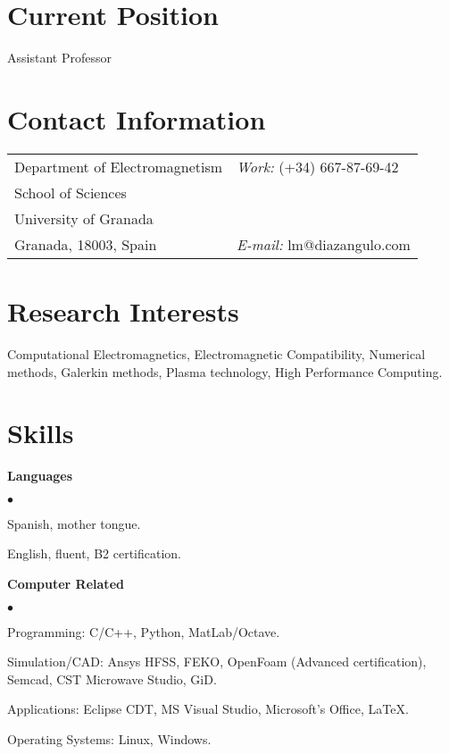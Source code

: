 \documentclass[margin,line]{res}
\newenvironment{list2}{
  \begin{list}{$\bullet$}{%
      \setlength{\itemsep}{0in}
      \setlength{\parsep}{0in} \setlength{\parskip}{0in}
      \setlength{\topsep}{0in} \setlength{\partopsep}{0in} 
      \setlength{\leftmargin}{0.2in}}}{\end{list}}
\begin{document}

\begin{resume}
\section{\sc Current Position}
 Assistant Professor
\section{\sc Contact Information}
\vspace{.05in}
\begin{tabular}{@{}p{2in}p{4in}}
Department of Electromagnetism   & {\it Work:}  (+34) 667-87-69-42 \\            
School of Sciences             & \\         
University of Granada            & \\
Granada, 18003, Spain            & {\it E-mail:}  lm@diazangulo.com\\       
\end{tabular}

\section{\sc Research Interests}
Computational Electromagnetics,
Electromagnetic Compatibility, 
Numerical methods, 
Galerkin methods,
Plasma technology,
High Performance Computing.

\section{\sc Skills} 
 {\bf Languages}
  \begin{list2}
   \item Spanish, mother tongue.
   \item English, fluent, B2 certification.
  \end{list2}
 {\bf Computer Related}
 \begin{list2} 
  \item Programming: C/C++, Python,  MatLab/Octave.
  \item Simulation/CAD: Ansys HFSS, FEKO, OpenFoam (Advanced certification), Semcad, CST Microwave Studio, GiD.
  \item Applications: Eclipse CDT, MS Visual Studio, Microsoft's Office, \LaTeX.
  \item Operating Systems: Linux, Windows.
  \end{list2}


\end{resume}
\end{document}
